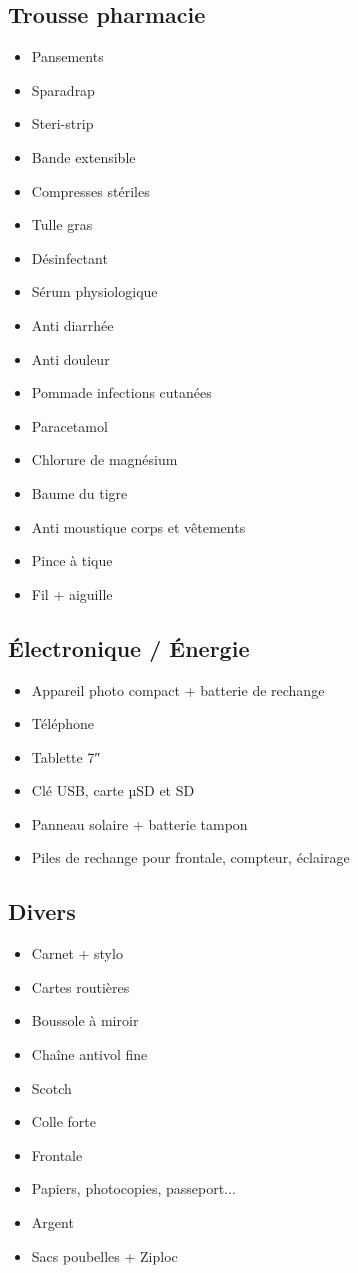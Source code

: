   \subsection*{Trousse pharmacie}
 \begin{itemize}
 \item Pansements
 \item Sparadrap
 \item Steri-strip
 \item Bande extensible
 \item Compresses stériles
 \item Tulle gras
 \item Désinfectant
 \item Sérum physiologique
 \item Anti diarrhée
 \item Anti douleur
 \item Pommade infections cutanées
 \item Paracetamol
 \item Chlorure de magnésium
 \item Baume du tigre
 \item Anti moustique corps et vêtements
 \item Pince à tique
 \item Fil + aiguille
 \end{itemize}
 
 \pagebreak
  \subsection*{Électronique / Énergie}
 \begin{itemize}
 \item Appareil photo compact + batterie de rechange
 \item Téléphone
 \item Tablette 7″
 \item Clé USB, carte µSD et SD
 \item Panneau solaire + batterie tampon
 \item Piles de rechange pour frontale, compteur, éclairage
 \end{itemize}
 
  \subsection*{Divers}
 \begin{itemize}
 \item Carnet + stylo
 \item Cartes routières
 \item Boussole à miroir
 \item Chaîne antivol fine
 \item Scotch
 \item Colle forte
 \item Frontale
 \item Papiers, photocopies, passeport...
 \item Argent
 \item Sacs poubelles + Ziploc
 \end{itemize}
